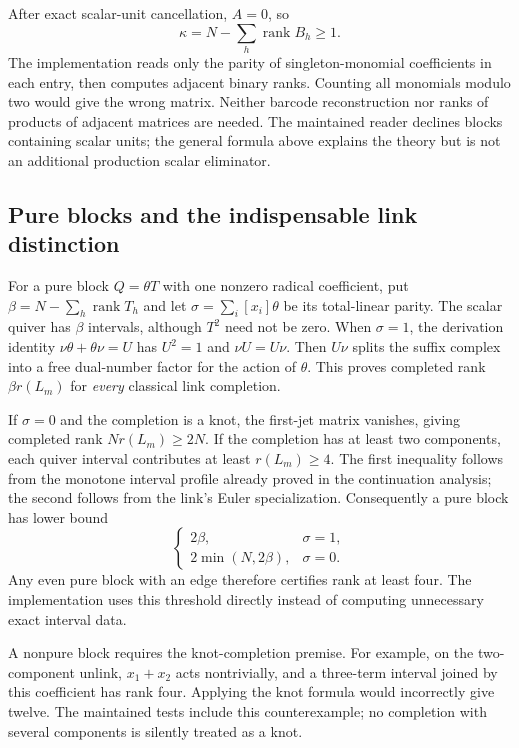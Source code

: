 After exact scalar-unit cancellation, $A=0$, so
\[
 \kappa=N-\sum_h\operatorname{rank} B_h\geq1.
\]
The implementation reads only the parity of singleton-monomial
coefficients in each entry, then computes adjacent binary ranks.  Counting
all monomials modulo two would give the wrong matrix.  Neither barcode
reconstruction nor ranks of products of adjacent matrices are needed.
The maintained reader declines blocks containing scalar units; the general
formula above explains the theory but is not an additional production
scalar eliminator.

\subsection{Pure blocks and the indispensable link distinction}

For a pure block $Q=\theta T$ with one nonzero radical coefficient, put
$\beta=N-\sum_h\operatorname{rank}T_h$ and let
$\sigma=\sum_i[x_i]\theta$ be its total-linear parity.  The scalar
quiver has $\beta$ intervals, although $T^2$ need not be zero.
When $\sigma=1$, the derivation identity
$\nu\theta+\theta\nu=U$ has $U^2=1$ and $\nu U=U\nu$.
Then $U\nu$ splits the suffix complex into a free dual-number factor
for the action of $\theta$.  This proves completed rank $\beta r(L_m)$
for \emph{every} classical link completion.

If $\sigma=0$ and the completion is a knot, the first-jet matrix vanishes,
giving completed rank $Nr(L_m)\geq2N$.  If the completion has at least
two components, each quiver interval contributes at least $r(L_m)\geq4$.
The first inequality follows from the monotone interval profile already
proved in the continuation analysis; the second follows from the link's
Euler specialization.  Consequently a pure block has lower bound
\[
 \begin{cases}
 2\beta,&\sigma=1,\\
 2\min(N,2\beta),&\sigma=0.
 \end{cases}
\]
Any even pure block with an edge therefore certifies rank at least four.
The implementation uses this threshold directly instead of computing
unnecessary exact interval data.

A nonpure block requires the knot-completion premise.  For example, on
the two-component unlink, $x_1+x_2$ acts nontrivially, and a three-term
interval joined by this coefficient has rank four.  Applying the knot
formula would incorrectly give twelve.  The maintained tests include
this counterexample; no completion with several components is silently
treated as a knot.

